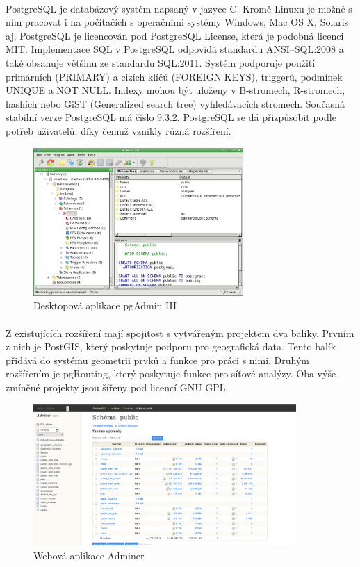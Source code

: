 \documentclass[11pt,a4paper,titlepage,oneside]{book}
\begin{document}
		\paragraph{}PostgreSQL je databázový systém napsaný v jazyce C. Kromě Linuxu je možné s ním pracovat i na počítačích s operačními systémy Windows, Mac OS X, Solaris aj. PostgreSQL je licencován pod PostgreSQL License, která je podobná licenci MIT.  Implementace SQL v PostgreSQL  odpovídá standardu ANSI--SQL:2008\cite{postgresql} a také obsahuje většinu ze standardu SQL:2011\cite{wiki_postgresql}. Systém podporuje použití primárních (PRIMARY) a cizích klíčů (FOREIGN KEYS), triggerů, podmínek UNIQUE a NOT NULL. Indexy mohou být uloženy v B-stromech, R-stromech, hashích nebo GiST (Generalized search tree) vyhledávacích stromech. Současná stabilní verze PostgreSQL má číslo 9.3.2. PostgreSQL se dá přizpůsobit podle potřeb uživatelů, díky čemuž vznikly různá rozšíření. 
		\begin{figure}[!h]
			\begin{center}
				\includegraphics[width=8cm]{obrazky/pgadmin3.png}
				\caption{Desktopová aplikace pgAdmin III}
				\label{fig:pgadmin}
			\end{center}
		\end{figure}
		\paragraph{}Z existujících rozšíření mají spojitost s vytvářeným projektem dva balíky. Prvním z nich je PostGIS, který poskytuje podporu pro geografická data. Tento balík přidává do systému geometrii prvků a funkce pro práci s nimi. Druhým rozšířením je pgRouting, který poskytuje funkce pro síťové analýzy. Oba výše zmíněné projekty jsou šířeny pod licencí GNU GPL.
		\begin{figure}[!h]
			\begin{center}
				\includegraphics[width=10cm]{obrazky/adminer.png}
				\caption{Webová aplikace Adminer}
				\label{fig:adminer}
			\end{center}
		\end{figure}			
\end{document}
